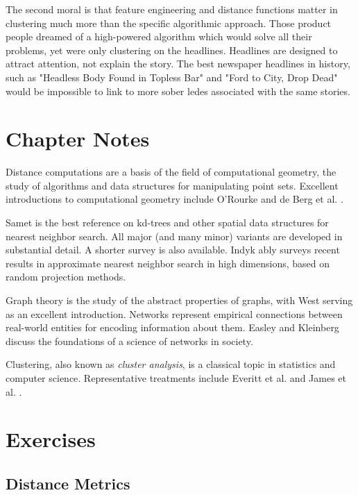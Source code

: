 \documentclass[10pt]{article}
\begin{document}
The second moral is that feature engineering and distance functions matter in clustering much more than the specific algorithmic approach. Those product people dreamed of a high-powered algorithm which would solve all their problems, yet were only clustering on the headlines. Headlines are designed to attract attention, not explain the story. The best newspaper headlines in history, such as "Headless Body Found in Topless Bar" and "Ford to City, Drop Dead" would be impossible to link to more sober ledes associated with the same stories.

\section{Chapter Notes}

Distance computations are a basis of the field of computational geometry, the study of algorithms and data structures for manipulating point sets. Excellent introductions to computational geometry include O'Rourke \cite{O'R01} and de Berg et al. \cite{dBvKOS00}.

Samet \cite{Sam06} is the best reference on kd-trees and other spatial data structures for nearest neighbor search. All major (and many minor) variants are developed in substantial detail. A shorter survey \cite{Sam05} is also available. Indyk \cite{Ind04} ably surveys recent results in approximate nearest neighbor search in high dimensions, based on random projection methods.

Graph theory is the study of the abstract properties of graphs, with West \cite{Wes00} serving as an excellent introduction. Networks represent empirical connections between real-world entities for encoding information about them. Easley and Kleinberg \cite{EK10} discuss the foundations of a science of networks in society.

Clustering, also known as \emph{cluster analysis}, is a classical topic in statistics and computer science. Representative treatments include Everitt et al. \cite{ELLS11} and James et al. \cite{JWHT13}.

\section{Exercises}

\subsection{Distance Metrics}
\end{document}
